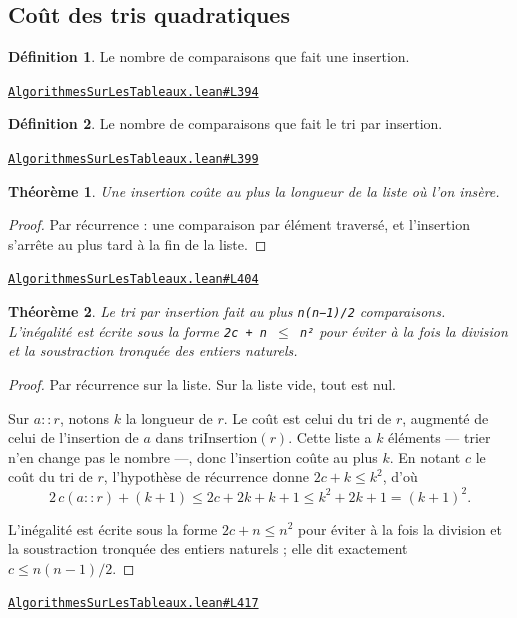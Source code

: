 \documentclass[11pt,a4paper]{article}
\theoremstyle{definition}
\newtheorem{definition}{Définition}
\theoremstyle{plain}
\newtheorem{theoreme}{Théorème}
\newcommand{\source}[2]{\par\smallskip\noindent\hfill{\footnotesize\href{#1}{\texttt{#2}}}\par\smallskip}
\begin{document}
\subsection{Coût des tris quadratiques}

\begin{definition}
Le nombre de comparaisons que fait une insertion.
\end{definition}
\source{https://github.com/Commutator-IO/learn-lean/blob/main/courses/02-lycee/11-informatique-nsi/AlgorithmesSurLesTableaux.lean\#L394}{AlgorithmesSurLesTableaux.lean\#L394}

\begin{definition}
Le nombre de comparaisons que fait le tri par insertion.
\end{definition}
\source{https://github.com/Commutator-IO/learn-lean/blob/main/courses/02-lycee/11-informatique-nsi/AlgorithmesSurLesTableaux.lean\#L399}{AlgorithmesSurLesTableaux.lean\#L399}

\begin{theoreme}
Une insertion coûte au plus la longueur de la liste où l'on insère.
\end{theoreme}
\begin{proof}
Par récurrence : une comparaison par élément traversé, et l'insertion s'arrête au plus
tard à la fin de la liste.
\end{proof}
\source{https://github.com/Commutator-IO/learn-lean/blob/main/courses/02-lycee/11-informatique-nsi/AlgorithmesSurLesTableaux.lean\#L404}{AlgorithmesSurLesTableaux.lean\#L404}

\begin{theoreme}
Le tri par insertion fait au plus \texttt{n(n−1)/2} comparaisons. L'inégalité est écrite
sous la forme \texttt{2c + n \(\le\) n²} pour éviter à la fois la division et la soustraction
tronquée des entiers naturels.
\end{theoreme}
\begin{proof}
Par récurrence sur la liste. Sur la liste vide, tout est nul.

Sur \(a :: r\), notons \(k\) la longueur de \(r\). Le coût est celui du tri de \(r\),
augmenté de celui de l'insertion de \(a\) dans \(\mathrm{triInsertion}(r)\). Cette liste
a \(k\) éléments — trier n'en change pas le nombre —, donc l'insertion coûte au plus
\(k\). En notant \(c\) le coût du tri de \(r\), l'hypothèse de récurrence donne
\(2c + k \le k^2\), d'où
\[ 2\,c(a :: r) + (k+1) \le 2c + 2k + k + 1 \le k^2 + 2k + 1 = (k+1)^2 . \]

L'inégalité est écrite sous la forme \(2c + n \le n^2\) pour éviter à la fois la
division et la soustraction tronquée des entiers naturels ; elle dit exactement
\(c \le n(n-1)/2\).
\end{proof}
\source{https://github.com/Commutator-IO/learn-lean/blob/main/courses/02-lycee/11-informatique-nsi/AlgorithmesSurLesTableaux.lean\#L417}{AlgorithmesSurLesTableaux.lean\#L417}
\end{document}
